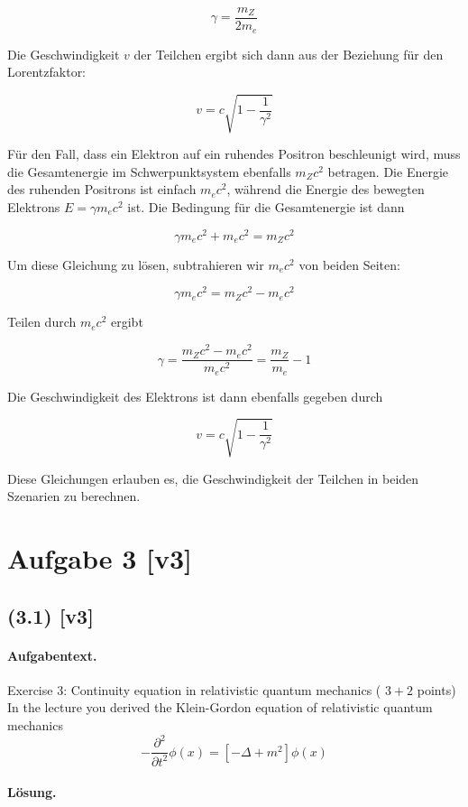 \documentclass[11pt,a4paper]{article}
\begin{document}
\[
\gamma = \frac{m_Z}{2 m_e}
\]

Die Geschwindigkeit \(v\) der Teilchen ergibt sich dann aus der Beziehung für den Lorentzfaktor:

\[
v = c \sqrt{1 - \frac{1}{\gamma^2}}
\]

Für den Fall, dass ein Elektron auf ein ruhendes Positron beschleunigt wird, muss die Gesamtenergie im Schwerpunktsystem ebenfalls \(m_Z c^2\) betragen. Die Energie des ruhenden Positrons ist einfach \(m_e c^2\), während die Energie des bewegten Elektrons \(E = \gamma m_e c^2\) ist. Die Bedingung für die Gesamtenergie ist dann

\[
\gamma m_e c^2 + m_e c^2 = m_Z c^2
\]

Um diese Gleichung zu lösen, subtrahieren wir \(m_e c^2\) von beiden Seiten:

\[
\gamma m_e c^2 = m_Z c^2 - m_e c^2
\]

Teilen durch \(m_e c^2\) ergibt

\[
\gamma = \frac{m_Z c^2 - m_e c^2}{m_e c^2} = \frac{m_Z}{m_e} - 1
\]

Die Geschwindigkeit des Elektrons ist dann ebenfalls gegeben durch

\[
v = c \sqrt{1 - \frac{1}{\gamma^2}}
\]

Diese Gleichungen erlauben es, die Geschwindigkeit der Teilchen in beiden Szenarien zu berechnen.


\section*{Aufgabe 3 [v3]}
\subsection*{(3.1) [v3]}
\paragraph{Aufgabentext.}
Exercise 3: Continuity equation in relativistic quantum mechanics ( $3+2$ points) In the lecture you derived the Klein-Gordon equation of relativistic quantum mechanics
$$
-\frac{\partial^2}{\partial t^2} \phi(x)=\left[-\Delta+m^2\right] \phi(x)
$$

\paragraph{Lösung.}
\end{document}
